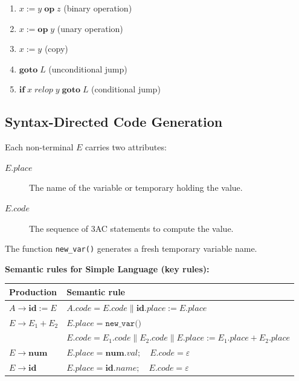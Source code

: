 \documentclass[12pt,a4paper]{article}
\begin{document}
\begin{enumerate}
  \item $x := y \;\mathbf{op}\; z$ \quad (binary operation)
  \item $x := \mathbf{op}\; y$ \quad (unary operation)
  \item $x := y$ \quad (copy)
  \item $\mathbf{goto}\; L$ \quad (unconditional jump)
  \item $\mathbf{if}\; x \;\mathit{relop}\; y\; \mathbf{goto}\; L$ \quad (conditional jump)
\end{enumerate}

\subsection{Syntax-Directed Code Generation}

Each non-terminal $E$ carries two attributes:
\begin{description}
  \item[$E.\textit{place}$] The name of the variable or temporary holding the value.
  \item[$E.\textit{code}$] The sequence of 3AC statements to compute the value.
\end{description}

The function \texttt{new\_var()} generates a fresh temporary variable name.

\textbf{Semantic rules for Simple Language (key rules):}

\begin{center}
\begin{tabular}{ll}
\toprule
Production & Semantic rule\\
\midrule
$A \to \mathbf{id} := E$
  & $A.\textit{code} = E.\textit{code} \mathbin{\|} \mathbf{id}.\mathit{place} := E.\mathit{place}$\\
$E \to E_1 + E_2$
  & $E.\textit{place} = \texttt{new\_var()}$\\
  & $E.\textit{code} = E_1.\textit{code} \mathbin{\|} E_2.\textit{code} \mathbin{\|} E.\mathit{place} := E_1.\mathit{place} + E_2.\mathit{place}$\\
$E \to \mathbf{num}$
  & $E.\textit{place} = \mathbf{num}.\textit{val};\quad E.\textit{code} = \varepsilon$\\
$E \to \mathbf{id}$
  & $E.\textit{place} = \mathbf{id}.\textit{name};\quad E.\textit{code} = \varepsilon$\\
\bottomrule
\end{tabular}
\end{center}
\end{document}
